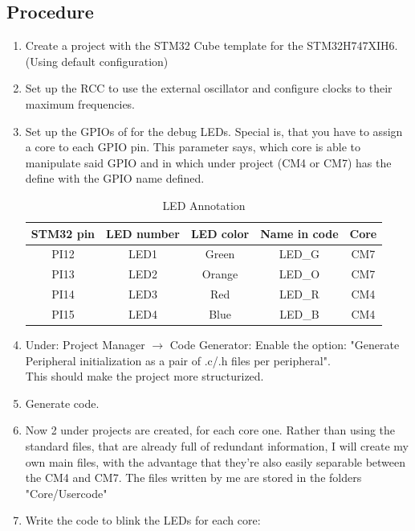 \subsection{Procedure}
\begin{enumerate}
	\item Create a project with the STM32 Cube template for the STM32H747XIH6. (Using default configuration)
	\item Set up the RCC to use the external oscillator and configure clocks to their maximum frequencies.
	\item Set up the GPIOs of for the debug LEDs. Special is, that you have to assign a core to each GPIO pin. This parameter says, which core is able to manipulate said GPIO and in which under project (CM4 or CM7) has the define with the GPIO name defined. 
		\begin{table}[H]
			\centering
			\label{tab:LED Annotation}
		\begin{tabular}{|| c | c | c | c | c ||} 
		\hline
		STM32 pin & LED number & LED color & Name in code & Core \\ [0.5ex] 
		\hline\hline
		PI12 & LED1 & Green & LED\_G & CM7 \\
		\hline
		PI13 & LED2 & Orange & LED\_O & CM7 \\
		\hline
		PI14 & LED3 & Red & LED\_R & CM4 \\
		\hline
		PI15 & LED4 & Blue & LED\_B & CM4 \\
		\hline
		\end{tabular}
			\caption{LED Annotation}
		\end{table}
	\item Under: Project Manager \(\rightarrow\) Code Generator: Enable the option: "Generate Peripheral initialization as a pair of .c/.h files per peripheral".
	\\ This should make the project more structurized.
	\item Generate code.
	\item Now 2 under projects are created, for each core one. Rather than using the standard files, that are already full of redundant information, I will create my own main files, with the advantage that they're also easily separable between the CM4 and CM7. The files written by me are stored in the folders "Core/Usercode"
	\item Write the code to blink the LEDs for each core:
		\begin{codeblock}
			

\end{codeblock}
\end{enumerate}
